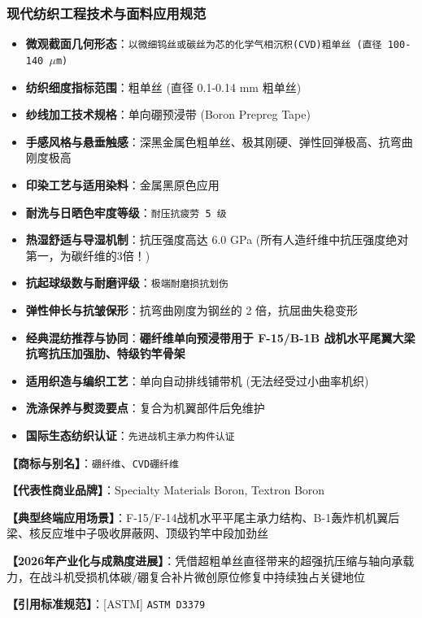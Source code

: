 \documentclass[11pt,openright,twoside,UTF8]{ctexbook}
\begin{document}
\subsubsection*{现代纺织工程技术与面料应用规范}
\begin{itemize} \setlength{\itemsep}{2pt}
    \item \textbf{微观截面几何形态}：\texttt{以微细钨丝或碳丝为芯的化学气相沉积(CVD)粗单丝 (直径 100-140 $\mu$m)}
    \item \textbf{纺织细度指标范围}：粗单丝 (直径 0.1-0.14 mm 粗单丝)
    \item \textbf{纱线加工技术规格}：单向硼预浸带 (Boron Prepreg Tape)
    \item \textbf{手感风格与悬垂触感}：深黑金属色粗单丝、极其刚硬、弹性回弹极高、抗弯曲刚度极高
    \item \textbf{印染工艺与适用染料}：金属黑原色应用
    \item \textbf{耐洗与日晒色牢度等级}：\texttt{耐压抗疲劳 5 级}
    \item \textbf{热湿舒适与导湿机制}：抗压强度高达 6.0 GPa (所有人造纤维中抗压强度绝对第一，为碳纤维的3倍！)
    \item \textbf{抗起球级数与耐磨评级}：\texttt{极端耐磨损抗划伤}
    \item \textbf{弹性伸长与抗皱保形}：抗弯曲刚度为钢丝的 2 倍，抗屈曲失稳变形
    \item \textbf{经典混纺推荐与协同}：\textbf{硼纤维单向预浸带用于 F-15/B-1B 战机水平尾翼大梁抗弯抗压加强肋、特级钓竿骨架}
    \item \textbf{适用织造与编织工艺}：单向自动排线铺带机 (无法经受过小曲率机织)
    \item \textbf{洗涤保养与熨烫要点}：复合为机翼部件后免维护
    \item \textbf{国际生态纺织认证}：\texttt{先进战机主承力构件认证}
\end{itemize}
\vspace{0.2cm}

\noindent\textbf{【商标与别名】}：\texttt{硼纤维}、\texttt{CVD硼纤维}\par
\noindent\textbf{【代表性商业品牌】}：Specialty Materials Boron, Textron Boron\par
\noindent\textbf{【典型终端应用场景】}：F-15/F-14战机水平平尾主承力结构、B-1轰炸机机翼后梁、核反应堆中子吸收屏蔽网、顶级钓竿中段加劲丝\par
\noindent\textbf{【2026年产业化与成熟度进展】}：凭借超粗单丝直径带来的超强抗压缩与轴向承载力，在战斗机受损机体碳/硼复合补片微创原位修复中持续独占关键地位\par
\noindent\textbf{【引用标准规范】}：[ASTM] \texttt{ASTM D3379}\par
\vspace{0.5cm}
\end{document}
